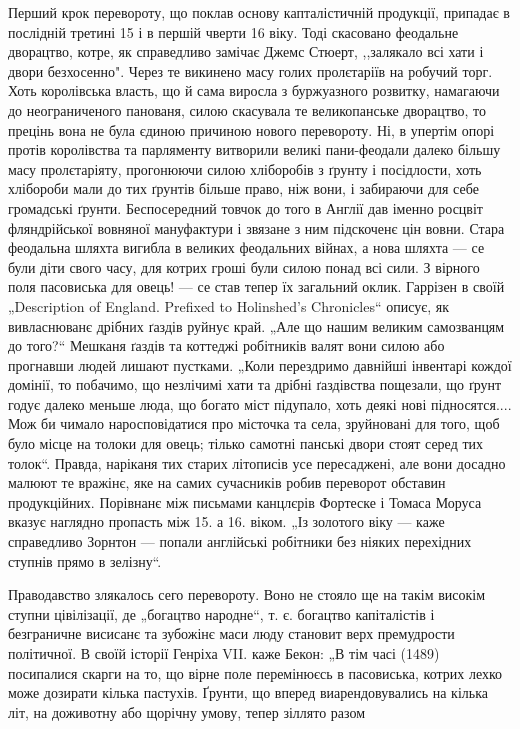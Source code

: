 Перший крок перевороту, що поклав основу капталістичній продукції, припадає в послідній третині 15 і
в першій чверти 16 віку. Тоді скасовано феодальне дворацтво, котре, як справедливо замічає Джемс
Стюерт, ,,залякало  всі хати і двори безхосенно". Через те викинено масу голих пролєтаріїв на
робучий торг. Хоть королівська власть, що й сама виросла з буржуазного розвитку, намагаючи до
неограниченого панованя, силою скасувала те великопанське дворацтво, то прецінь вона не була єдиною
причиною нового перевороту. Ні, в упертім опорі протів королівства та
парляменту витворили великі пани-феодали далеко більшу масу пролєтаріяту, прогонюючи силою
хліборобів з ґрунту і посідлости, хоть хлібороби мали до тих ґрунтів більше право, ніж вони, і
забираючи для себе громадські ґрунти. Беспосередний товчок до того в Англії дав іменно росцвіт
фляндрійської вовняної мануфактури і звязане з ним підскоченє цін вовни. Стара феодальна шляхта
вигибла в великих феодальних війнах, а нова шляхта — се були діти свого часу, для котрих гроші були
силою понад всі сили. З вірного поля пасовиська для овець! — се став тепер їх загальний оклик.
Гаррізен в своїй „Description of England. Prefixed to Holinshed’s Chronicles“ описує, як
вивласнюванє дрібних ґаздів руйнує край. „Але що нашим великим самозванцям до того?“ Мешканя ґаздів
та коттеджі робітників валят вони силою або прогнавши людей лишают пустками. „Коли перездримо
давнійші інвентарі кождої домінії, то побачимо, що незлічимі хати та дрібні ґаздівства пощезали, що
ґрунт годує далеко меньше люда, що богато міст підупало, хоть деякі нові підносятся.... Мож би
чимало наросповідатися про місточка та села, зруйновані для того, щоб було місце на толоки для
овець; тілько самотні панські двори стоят серед тих толок“. Правда, наріканя тих старих літописів
усе пересаджені, але вони досадно малюют те вражінє, яке на самих сучасників робив переворот
обставин продукційних. Порівнанє між письмами канцлєрів Фортеске і Томаса Моруса вказує наглядно
пропасть між 15. а 16. віком. „Із золотого віку — каже справедливо Зорнтон — попали англійські
робітники без ніяких перехідних ступнів прямо в зелізну“.

Праводавство злякалось сего перевороту. Воно не стояло ще на такім високім ступни цівілізації, де
„богацтво народне“, т. є. богацтво капіталістів і безграничне висисанє та зубожінє маси люду
становит верх премудрости
політичної. В своїй історії Генріха VII. каже Бекон: „В тім часі (1489) посипалися скарги на то, що
вірне поле перемінюєсь в пасовиська, котрих лехко може дозирати кілька пастухів. Ґрунти, що вперед
виарендовувались на кілька літ, на доживотну або щорічну умову, тепер зіллято разом
